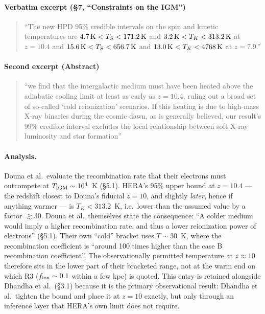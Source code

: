 \documentclass[11pt,a4paper]{article}
\begin{document}
\paragraph{Verbatim excerpt (\S7, ``Constraints on the IGM'')}
\begin{quote}\small
``The new HPD 95\% credible intervals on the spin and kinetic temperatures are
$4.7\,{\rm K} < T_S < 171.2\,{\rm K}$ and $3.2\,{\rm K} < T_K < 313.2\,{\rm K}$
at $z = 10.4$ and $15.6\,{\rm K} < T_S < 656.7\,{\rm K}$ and
$13.0\,{\rm K} < T_K < 4768\,{\rm K}$ at $z = 7.9$.''
\end{quote}

\paragraph{Second excerpt (Abstract)}
\begin{quote}\small
``we find that the intergalactic medium must have been heated above the
adiabatic cooling limit at least as early as $z = 10.4$, ruling out a broad set
of so-called `cold reionization' scenarios. If this heating is due to high-mass
X-ray binaries during the cosmic dawn, as is generally believed, our result's
99\% credible interval excludes the local relationship between soft X-ray
luminosity and star formation''
\end{quote}

\paragraph{Analysis.}
Douna et al.\ evaluate the recombination rate that their electrons must
outcompete at $T_{\rm IGM}\sim10^{4}$~K (\S5.1). HERA's 95\% upper bound at
$z=10.4$ --- the redshift closest to Douna's fiducial $z=10$, and slightly
\emph{later}, hence if anything warmer --- is $T_K < 313.2$~K, i.e.\ lower than
the assumed value by a factor $\gtrsim30$. Douna et al.\ themselves state the
consequence: ``A colder medium would imply a higher recombination rate, and thus
a lower reionization power of electrons'' (\S5.1). Their own ``cold'' bracket
uses $T\sim30$~K, where the recombination coefficient is ``around 100 times
higher than the case B recombination coefficient''. The observationally
permitted temperature at $z\approx10$ therefore sits in the lower part of their
bracketed range, not at the warm end on which R3 ($f_{\rm ion}\sim0.1$ within a
few kpc) is quoted. This entry is retained alongside Dhandha et al.\ (\S3.1)
because it is the primary observational result: Dhandha et al.\ tighten the
bound and place it at $z=10$ exactly, but only through an inference layer that
HERA's own limit does not require.
\end{document}
